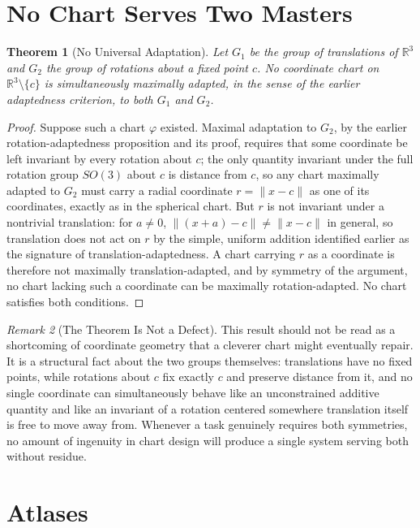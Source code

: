 \documentclass[11pt,fleqn]{book}
\numberwithin{equation}{chapter}
\theoremstyle{plain}
\newtheorem{theorem}{Theorem}[chapter]
\theoremstyle{definition}
\theoremstyle{remark}
\newtheorem{remark}[theorem]{Remark}
\newcommand{\R}{\mathbb{R}}
\begin{document}
\section{No Chart Serves Two Masters}

\begin{theorem}[No Universal Adaptation]
Let \(G_1\) be the group of translations of \(\R^3\) and \(G_2\) the group of rotations about a fixed point \(c\). No coordinate chart on \(\R^3\setminus\{c\}\) is simultaneously maximally adapted, in the sense of the earlier adaptedness criterion, to both \(G_1\) and \(G_2\).
\end{theorem}

\begin{proof}
Suppose such a chart \(\varphi\) existed. Maximal adaptation to \(G_2\), by the earlier rotation-adaptedness proposition and its proof, requires that some coordinate be left invariant by every rotation about \(c\); the only quantity invariant under the full rotation group \(SO(3)\) about \(c\) is distance from \(c\), so any chart maximally adapted to \(G_2\) must carry a radial coordinate \(r=\|x-c\|\) as one of its coordinates, exactly as in the spherical chart. But \(r\) is not invariant under a nontrivial translation: for \(a\neq 0\), \(\|(x+a)-c\|\neq\|x-c\|\) in general, so translation does not act on \(r\) by the simple, uniform addition identified earlier as the signature of translation-adaptedness. A chart carrying \(r\) as a coordinate is therefore not maximally translation-adapted, and by symmetry of the argument, no chart lacking such a coordinate can be maximally rotation-adapted. No chart satisfies both conditions.
\end{proof}

\begin{remark}[The Theorem Is Not a Defect]
This result should not be read as a shortcoming of coordinate geometry that a cleverer chart might eventually repair. It is a structural fact about the two groups themselves: translations have no fixed points, while rotations about \(c\) fix exactly \(c\) and preserve distance from it, and no single coordinate can simultaneously behave like an unconstrained additive quantity and like an invariant of a rotation centered somewhere translation itself is free to move away from. Whenever a task genuinely requires both symmetries, no amount of ingenuity in chart design will produce a single system serving both without residue.
\end{remark}

\section{Atlases}
\end{document}
